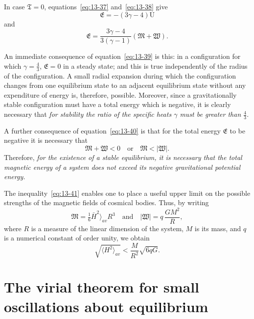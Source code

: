 In case $\mathfrak{T} = 0$, equations~\eqref{eq:13-37} and~\eqref{eq:13-38} give
\begin{equation}
\label{eq:13-39}
\mathfrak{E} = -(3\gamma-4)\mathrm{U}
\end{equation}
and
\begin{equation}
\label{eq:13-40}
\mathfrak{E} = \frac{3\gamma-4}{3(\gamma-1)}(\mathfrak{M}+\mathfrak{W}).
\end{equation}

An immediate consequence of equation~\eqref{eq:13-39} is this: in a configuration for which $\gamma = \frac{4}{3}$, $\mathfrak{E} = 0$ in a steady state; and this is true independently of the radius of the configuration. A small radial expansion during which the configuration changes from one equilibrium state to an adjacent equilibrium state without any expenditure of energy is, therefore, possible. Moreover, since a gravitationally stable configuration must have a total energy which is negative, it is clearly necessary that \textit{for stability the ratio of the specific heats $\gamma$ must be greater than $\frac{4}{3}$}.

A further consequence of equation~\eqref{eq:13-40} is that for the total energy $\mathfrak{E}$ to be negative it is necessary that
\begin{equation}
\label{eq:13-41}
\mathfrak{M}+\mathfrak{W} < 0 \quad \text{or} \quad \mathfrak{M} < |\mathfrak{W}|.
\end{equation}
Therefore, \textit{for the existence of a stable equilibrium, it is necessary that the total magnetic energy of a system does not exceed its negative gravitational potential energy.}

The inequality~\eqref{eq:13-41} enables one to place a useful upper limit on the possible strengths of the magnetic fields of cosmical bodies. Thus, by writing
\begin{equation}
\label{eq:13-42}
\mathfrak{M} = \tfrac{1}{6}\bar{H}^2\rangle_{av} R^3 \quad \text{and} \quad |\mathfrak{W}| = q\,\frac{GM^2}{R},
\end{equation}
where $R$ is a measure of the linear dimension of the system, $M$ is its mass, and $q$ is a numerical constant of order unity, we obtain
\begin{equation}
\label{eq:13-43}
\sqrt{\langle H^2\rangle_{av}} < \frac{M}{R^2}\sqrt{6qG}.
\end{equation}

\section{The virial theorem for small oscillations about equilibrium}
\label{sec:118}

